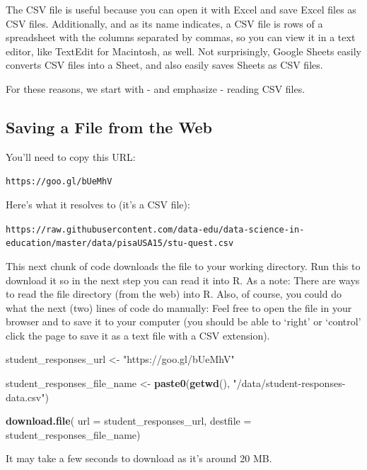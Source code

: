 \documentclass[]{book}
\newenvironment{Shaded}{\begin{snugshade}}{\end{snugshade}}
\newcommand{\KeywordTok}[1]{\textcolor[rgb]{0.13,0.29,0.53}{\textbf{#1}}}
\newcommand{\DataTypeTok}[1]{\textcolor[rgb]{0.13,0.29,0.53}{#1}}
\newcommand{\StringTok}[1]{\textcolor[rgb]{0.31,0.60,0.02}{#1}}
\newcommand{\NormalTok}[1]{#1}
\begin{document}
The CSV file is useful because you can open it with Excel and save Excel
files as CSV files. Additionally, and as its name indicates, a CSV file
is rows of a spreadsheet with the columns separated by commas, so you
can view it in a text editor, like TextEdit for Macintosh, as well. Not
surprisingly, Google Sheets easily converts CSV files into a Sheet, and
also easily saves Sheets as CSV files.

For these reasons, we start with - and emphasize - reading CSV files.

\subsection{Saving a File from the
Web}\label{saving-a-file-from-the-web}

You'll need to copy this URL:

\texttt{https://goo.gl/bUeMhV}

Here's what it resolves to (it's a CSV file):

\texttt{https://raw.githubusercontent.com/data-edu/data-science-in-education/master/data/pisaUSA15/stu-quest.csv}

This next chunk of code downloads the file to your working directory.
Run this to download it so in the next step you can read it into R. As a
note: There are ways to read the file directory (from the web) into R.
Also, of course, you could do what the next (two) lines of code do
manually: Feel free to open the file in your browser and to save it to
your computer (you should be able to `right' or `control' click the page
to save it as a text file with a CSV extension).

\begin{Shaded}
\begin{Highlighting}[]
\NormalTok{student_responses_url <-}
\StringTok{    "https://goo.gl/bUeMhV"}

\NormalTok{student_responses_file_name <-}
\StringTok{    }\KeywordTok{paste0}\NormalTok{(}\KeywordTok{getwd}\NormalTok{(), }\StringTok{"/data/student-responses-data.csv"}\NormalTok{)}

\KeywordTok{download.file}\NormalTok{(}
    \DataTypeTok{url =}\NormalTok{ student_responses_url,}
    \DataTypeTok{destfile =}\NormalTok{ student_responses_file_name)}
\end{Highlighting}
\end{Shaded}

It may take a few seconds to download as it's around 20 MB.
\end{document}
